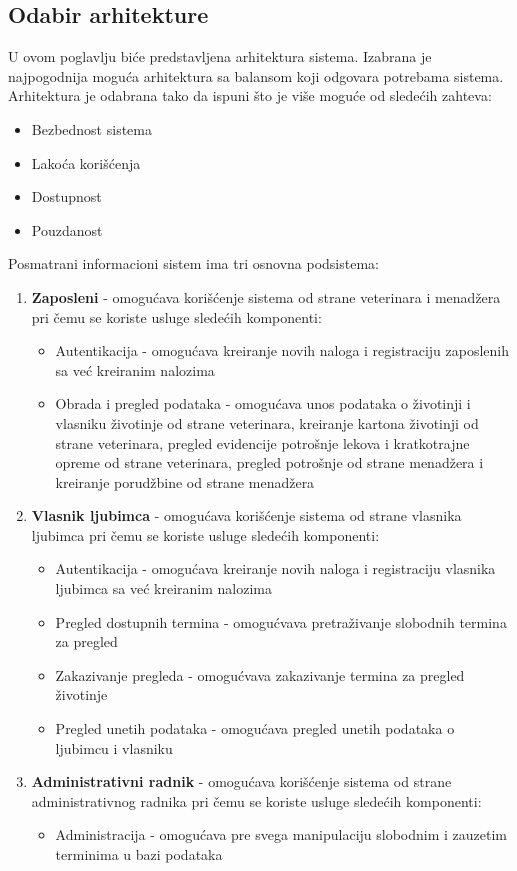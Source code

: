 \subsection{Odabir arhitekture}
U ovom poglavlju biće predstavljena arhitektura sistema. 
Izabrana je najpogodnija moguća arhitektura sa balansom koji odgovara potrebama sistema.
Arhitektura je odabrana tako da ispuni što je više moguće od sledećih zahteva:
\begin{itemize}
    \item Bezbednost sistema
    \item Lakoća korišćenja
    \item Dostupnost
    \item Pouzdanost
\end{itemize}

Posmatrani informacioni sistem ima tri osnovna podsistema:

\begin{enumerate}
    \item \textbf{Zaposleni} - omogućava korišćenje sistema od strane veterinara i menadžera pri čemu se koriste usluge sledećih komponenti:
        \begin{itemize}
            \item Autentikacija - omogućava kreiranje novih naloga i registraciju zaposlenih sa već kreiranim nalozima
            \item Obrada i pregled podataka - omogućava unos podataka o životinji i vlasniku životinje od strane veterinara, kreiranje kartona životinji od strane veterinara, pregled evidencije potrošnje lekova i kratkotrajne opreme od strane veterinara, pregled potrošnje od strane menadžera i kreiranje porudžbine od strane menadžera
        \end{itemize}
    \item \textbf{Vlasnik ljubimca} - omogućava korišćenje sistema od strane vlasnika ljubimca pri čemu se koriste usluge sledećih komponenti:
        \begin{itemize}
            \item Autentikacija - omogućava kreiranje novih naloga i registraciju vlasnika ljubimca sa već kreiranim nalozima
            \item Pregled dostupnih termina - omogućvava pretraživanje slobodnih termina za pregled
            \item Zakazivanje pregleda - omogućvava zakazivanje termina za pregled životinje
            \item Pregled unetih podataka - omogućava pregled unetih podataka o ljubimcu i vlasniku
        \end{itemize}
    \item \textbf{Administrativni radnik} - omogućava korišćenje sistema od strane administrativnog radnika pri čemu se koriste usluge sledećih komponenti:
        \begin{itemize}
            \item Administracija - omogućava pre svega manipulaciju slobodnim i zauzetim terminima u bazi podataka
        \end{itemize}
\end{enumerate}


